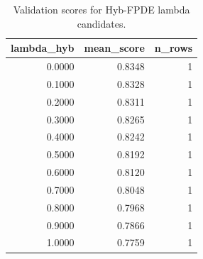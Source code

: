 \begin{table}[t]
\caption{Validation scores for Hyb-FPDE lambda candidates.}
\label{tab:lambda_distribution_computed}
\centering
\begin{tabular}{rrr}
\toprule
lambda\_hyb & mean\_score & n\_rows \\
\midrule
0.0000 & 0.8348 & 1 \\
0.1000 & 0.8328 & 1 \\
0.2000 & 0.8311 & 1 \\
0.3000 & 0.8265 & 1 \\
0.4000 & 0.8242 & 1 \\
0.5000 & 0.8192 & 1 \\
0.6000 & 0.8120 & 1 \\
0.7000 & 0.8048 & 1 \\
0.8000 & 0.7968 & 1 \\
0.9000 & 0.7866 & 1 \\
1.0000 & 0.7759 & 1 \\
\bottomrule
\end{tabular}

\end{table}
